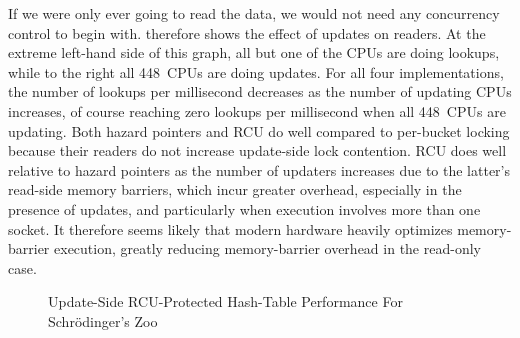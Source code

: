 If we were only ever going to read the data, we would not need any
concurrency control to begin with.
therefore shows the effect of updates on readers.
At the extreme left-hand side of this graph, all but one of the CPUs
are doing lookups, while to the right all 448~CPUs are doing updates.
For all four implementations, the number of lookups per millisecond
decreases as the number of updating CPUs increases, of course reaching
zero lookups per millisecond when all 448~CPUs are updating.
Both hazard pointers and RCU do well compared to per-bucket locking
because their readers do not increase update-side lock contention.
RCU does well relative to hazard pointers as the number of updaters
increases due to the latter's read-side memory barriers, which incur
greater overhead, especially in the presence of updates, and particularly
when execution involves more than one socket.
It therefore seems likely that modern hardware heavily optimizes memory-barrier
execution, greatly reducing memory-barrier overhead in the read-only case.

\begin{figure}
\centering
{}
\caption{Update-Side RCU-Protected Hash-Table Performance For Schr\"odinger's Zoo}
\label{fig:datastruct:Update-Side RCU-Protected Hash-Table Performance For Schroedinger's Zoo}
\end{figure}

